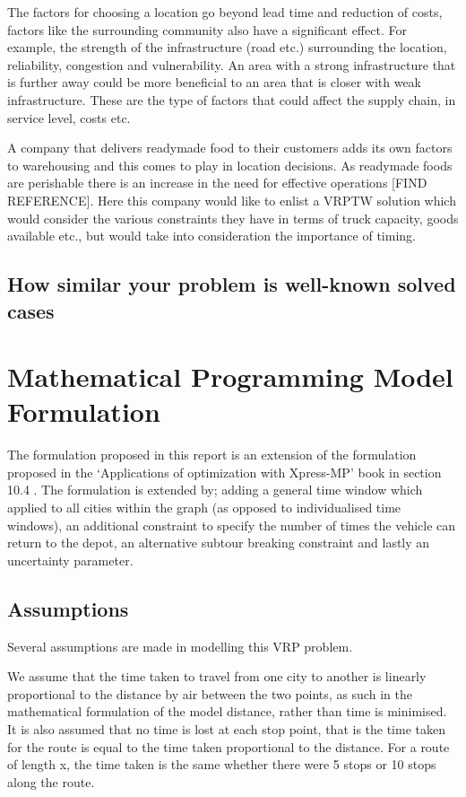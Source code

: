 \documentclass[a4paper,11pt]{article}
\begin{document}
The factors for choosing a location go beyond lead time and reduction of costs, factors like the surrounding community also have a significant effect. For example, the strength of the infrastructure (road etc.) surrounding the location, reliability, congestion and vulnerability. An area with a strong infrastructure that is further away could be more beneficial to an area that is closer with weak infrastructure. These are the type of factors that could affect the supply chain, in service level, costs etc. 

A company that delivers readymade food to their customers adds its own factors to warehousing and this comes to play in location decisions. As readymade foods are perishable there is an increase in the need for effective operations [FIND REFERENCE]. Here this company would like to enlist a VRPTW solution which would consider the various constraints they have in terms of truck capacity, goods available etc., but would take into consideration the importance of timing.

\subsection{How similar your problem is well-known solved cases}

\section{Mathematical Programming Model Formulation}

The formulation proposed in this report is an extension of the formulation proposed in the `Applications of optimization with Xpress-MP' book in section 10.4 \cite{gueret1999applications}. The formulation is extended by; adding a general time window which applied to all cities within the graph (as opposed to individualised time windows), an additional constraint to specify the number of times the vehicle can return to the depot, an alternative subtour breaking constraint and lastly an uncertainty parameter.

\subsection{Assumptions}
Several assumptions are made in modelling this VRP problem.

We assume that the time taken to travel from one city to another is linearly proportional to the distance by air between the two points, as such in the mathematical formulation of the model distance, rather than time is minimised. It is also assumed that no time is lost at each stop point, that is the time taken for the route is equal to the time taken proportional to the distance. For a route of length x, the time taken is the same whether there were 5 stops or 10 stops along the route. 
\end{document}
